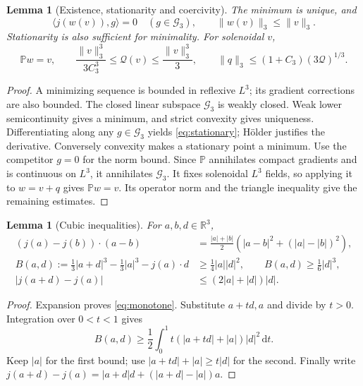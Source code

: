 \documentclass[11pt,a4paper]{article}
\newtheorem{lemma}[theorem]{Lemma}
\theoremstyle{definition}
\theoremstyle{remark}
\newcommand{\R}{\mathbb R}
\newcommand{\G}{\mathcal G_3}
\newcommand{\Q}{\mathcal Q}
\newcommand{\PP}{\mathbb P}
\newcommand{\dd}{\,\mathrm d}
\newcommand{\norm}[1]{\lVert #1\rVert}
\newcommand{\ip}[2]{\langle #1,#2\rangle}
\numberwithin{equation}{section}
\begin{document}
\begin{lemma}[Existence, stationarity and coercivity]\label{lem:minimum}
The minimum is unique, and
\begin{equation}\label{eq:stationary}
\ip{j(w(v))}{g}=0\quad(g\in\G),\qquad \norm{w(v)}_3\le\norm v_3.
\end{equation}
Stationarity is also sufficient for minimality. For solenoidal \(v\),
\begin{equation}\label{eq:coercive}
\PP w=v,\qquad
\frac{\norm v_3^3}{3C_3^3}\le\Q(v)\le\frac{\norm v_3^3}{3},\qquad
\norm q_3\le(1+C_3)(3\Q)^{1/3}.
\end{equation}
\end{lemma}
\begin{proof}
A minimizing sequence is bounded in reflexive \(L^3\); its gradient corrections are also bounded. The closed linear subspace \(\G\) is weakly closed. Weak lower semicontinuity gives a minimum, and strict convexity gives uniqueness. Differentiating along any \(g\in\G\) yields \eqref{eq:stationary}; Hölder justifies the derivative. Conversely convexity makes a stationary point a minimum. Use the competitor \(g=0\) for the norm bound. Since \(\PP\) annihilates compact gradients and is continuous on \(L^3\), it annihilates \(\G\). It fixes solenoidal \(L^3\) fields, so applying it to \(w=v+q\) gives \(\PP w=v\). Its operator norm and the triangle inequality give the remaining estimates.
\end{proof}

\begin{lemma}[Cubic inequalities]\label{lem:cubic}
For \(a,b,d\in\R^3\),
\begin{align}
(j(a)-j(b))\cdot(a-b)
&=\frac{|a|+|b|}{2}\left(|a-b|^2+(|a|-|b|)^2\right),\label{eq:monotone}\\
B(a,d):=\tfrac13|a+d|^3-\tfrac13|a|^3-j(a)\cdot d
&\ge\tfrac14|a||d|^2,\qquad B(a,d)\ge\tfrac16|d|^3,\label{eq:bregman}\\
|j(a+d)-j(a)|&\le(2|a|+|d|)|d|.\label{eq:jlip}
\end{align}
\end{lemma}
\begin{proof}
Expansion proves \eqref{eq:monotone}. Substitute \(a+td,a\) and divide by \(t>0\). Integration over \(0<t<1\) gives
\[
B(a,d)\ge\frac12\int_0^1t(|a+td|+|a|)|d|^2\dd t.
\]
Keep \(|a|\) for the first bound; use \(|a+td|+|a|\ge t|d|\) for the second. Finally write \(j(a+d)-j(a)=|a+d|d+(|a+d|-|a|)a\).
\end{proof}
\end{document}
